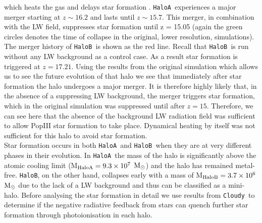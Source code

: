 \documentclass[twocolumn,iop,revtex4]{openjournal}
\newcommand{\cloudy}{\texttt{Cloudy~}}
\newcommand{\msolar} {$\rm{M_{\odot}}~$}
\newcommand{\msolarc} {$\rm{M_{\odot}}$}
\newcommand{\ha} {\texttt{HaloA~}}
\newcommand{\hb} {\texttt{HaloB~}}
\newcommand{\hbc} {\texttt{HaloB}}
\begin{document}
which heats the gas and delays star formation \citep{Wise_2019}. 
\ha experiences a major merger starting at $z \sim 16.2$ and lasts until $z \sim 15.7$. This
merger, in combination with the LW field, suppresses star formation until z = 15.05 (again the green
circles denotes the time of collapse in the original, lower resolution, simulations). The merger
history of \hb is shown as the red line. Recall that \hb is run without any LW background as
a control case. As a
result star formation is triggered at $z = 17.21$. Using the results from the original simulation
which allows us to see the future evolution of that halo we see that immediately after star formation
the halo undergoes a major merger. It is therefore highly likely that, in the absence of a suppressing
LW background, the merger triggers star formation, which in the original simulation was
suppressed until after $z = 15$. Therefore, we can see here that the absence of the background
LW radiation field was sufficient to allow PopIII star formation to take place. Dynamical heating
by itself was not sufficient for this halo to avoid star formation. \\
\indent Star formation occurs in both \ha and \hb when they are at very different phases in
their evolution.
In \ha the mass of the halo is significantly above the atomic cooling limit
(M$_{\rm{HaloA}} = 9.3 \times 10^7$ \msolarc) and the halo has
remained metal-free. \hbc, on the other hand, collapses early with a mass of
M$_{\rm{HaloB}} = 3.7 \times 10^6$ \msolar due to the lack of a LW background and thus can
be classified as a mini-halo. Before analysing the star formation in detail we use results
from \cloudy to determine if the negative radiative feedback from stars can
quench further star formation through photoionisation in each halo. 

\end{document}
